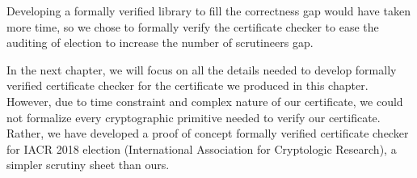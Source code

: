 Developing a formally verified library to fill the correctness gap would have taken more time,
so we chose to formally verify the certificate checker to ease the auditing of election to 
increase the number of scrutineers gap. 
 
In the next chapter, we will focus on all the details needed to 
develop formally verified certificate checker for the certificate we produced in this chapter. 
However, due to time constraint and complex nature of our certificate, we could not 
formalize every cryptographic primitive needed to verify our certificate. Rather, 
we have developed a proof of concept formally verified certificate checker for 
 IACR 2018 election (International Association for Cryptologic Research), a simpler 
 scrutiny sheet than ours.  
